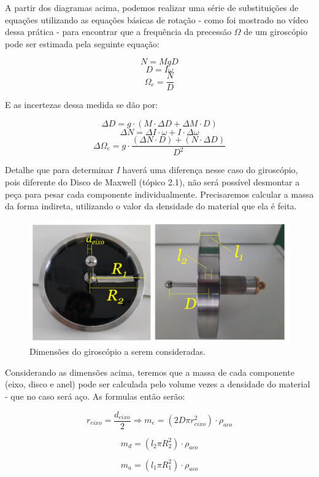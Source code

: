 A partir dos diagramas acima, podemos realizar uma série de substituições de equações utilizando as equações básicas de rotação - como foi mostrado no vídeo dessa prática - para encontrar que a frequência da precessão $\Omega$ de um giroscópio pode ser estimada pela seguinte equação:

\[ N = MgD \]
\[ D = I \omega \]
\[ \Omega _e = \frac{N}{D} \]

E as incertezas dessa medida se dão por:

\[ \Delta D = g \cdot (M \cdot \Delta D + \Delta M \cdot D) \]
\[ \Delta N = \Delta I \cdot \omega + I \cdot \Delta \omega \]
\[ \Delta \Omega _e = g \cdot \frac{(\Delta N \cdot D) + (N \cdot \Delta D)}{D^2} \]

Detalhe que para determinar \textit{I} haverá uma diferença nesse caso do giroscópio, pois diferente do Disco de Maxwell (tópico 2.1), não será possível desmontar a peça para pesar cada componente individualmente. Precisaremos calcular a massa da forma indireta, utilizando o valor da densidade do material que ela é feita.\\

\begin{figure}[H]
  \centering
  \includegraphics[scale=0.5]{images/medidas-giroscopio.png}
  \caption{Dimensões do giroscópio a serem consideradas.}
\end{figure}

Considerando as dimensões acima, teremos que a massa de cada componente (eixo, disco e anel) pode ser calculada pelo volume vezes a densidade do material - que no caso será aço. As formulas então serão:

\[ r_{eixo} = \frac{d_{eixo}}{2} \Rightarrow m_e = (2 D \pi r_{eixo}^2) \cdot \rho_{aco}\]

\[ m_d = (l_2 \pi R_2^2) \cdot \rho_{aco} \]

\[ m_a = (l_1 \pi R_1^2) \cdot \rho_{aco} \]

